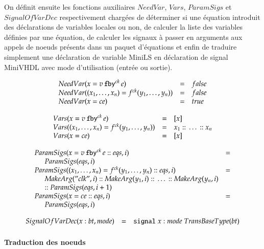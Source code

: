\documentclass[9pt,a4paper]{article}
\newcommand{\mybox}[1]{\mbox{\tt{#1}}}
\newcommand{\ind}[0]{\hspace{0.5cm}}
\newcommand{\Cons}[0]{\; \mathbf{::} \;}
\newcommand{\Fby}[2]{#1 \, \mybox{fby}^{ck} \, #2}
\newcommand{\App}[2]{#1^{ck}(#2)}
\begin{document}
On définit ensuite les fonctions auxiliaires $NeedVar$, $Vars$, $ParamSigs$ et
$SignalOfVarDec$ respectivement chargées de déterminer si une équation introduit
des déclarations de variables locales ou non, de calculer la liste des variables
définies par une équation, de calculer les signaux à passer en arguments aux
appels de noeuds présents dans un paquet d'équations et enfin de traduire
simplement une déclaration de variable MiniLS en déclaration de signal MiniVHDL
avec mode d'utilisation (entrée ou sortie).

\newcommand{\NV}[1]{NeedVar(#1)}
\newcommand{\V}[1]{Vars(#1)}
\newcommand{\PS}[2]{ParamSigs(#1,#2)}
\newcommand{\SoVD}[3]{SignalOfVarDec(#1 : #2, #3)}

\[
\begin{array}{lcl}
  \NV{x = \Fby{v}{e}} & = & false \\
  \NV{(x_1,\dots,x_n) = \App{f}{y_1,\dots,y_n}} & = & false \\
  \NV{x = ce} & = & true
\end{array}
\]

\[
\begin{array}{lcl}
  \V{x = \Fby{v}{e}} & = & [x] \\
  \V{(x_1,\dots,x_n) = \App{f}{y_1,\dots,y_n}} & = & x_1 \Cons \dots \Cons x_n \\
  \V{x = ce} & = & [x]
\end{array}
\]

\[
\begin{array}{ll}
  \PS{x = \Fby{v}{e} \Cons eqs}{i} & = \\
  \ind \PS{eqs}{i} \\
  \PS{(x_1,\dots,x_n) = \App{f}{y_1,\dots,y_n} \Cons eqs}{i} & = \\
  \ind \MA{"clk"}{i} \Cons \MA{y_1}{i} \Cons \dots \Cons \MA{y_n}{i} \\
  \ind \mathtt{::} \; \PS{eqs}{i + 1}
  \\
  \PS{x = ce \Cons eqs}{i} & = \\
  \ind \PS{eqs}{i}
\end{array}
\]

\[
\begin{array}[lcl]{lcl}
  \SoVD{x}{bt}{mode} & = & \mybox{signal} \; x : mode \; TransBaseType(bt)
\end{array}
\]

\paragraph{Traduction des noeuds}
\end{document}
